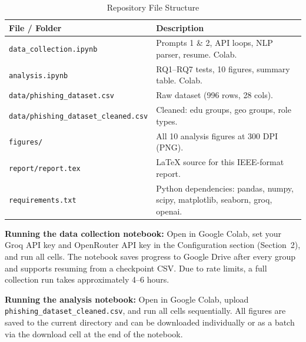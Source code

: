 \documentclass[conference]{IEEEtran}
\begin{document}
\begin{table}[htbp]
\caption{Repository File Structure}
\label{tab:filestructure}
\begin{center}
\renewcommand{\arraystretch}{1.2}
\fontsize{7.5}{9.5}\selectfont
\begin{tabular}{|>{\raggedright\arraybackslash}p{3.2cm}|>{\raggedright\arraybackslash}p{4.4cm}|}
\hline
\textbf{File / Folder} & \textbf{Description} \\
\hline
\texttt{data\_collection.ipynb}
  & Prompts 1 \& 2, API loops, NLP parser, resume. Colab. \\
\hline
\texttt{analysis.ipynb}
  & RQ1--RQ7 tests, 10 figures, summary table. Colab. \\
\hline
\texttt{data/phishing\_dataset.csv}
  & Raw dataset (996 rows, 28 cols). \\
\hline
\texttt{data/phishing\_dataset\_cleaned.csv}
  & Cleaned: edu groups, geo groups, role types. \\
\hline
\texttt{figures/}
  & All 10 analysis figures at 300 DPI (PNG). \\
\hline
\texttt{report/report.tex}
  & LaTeX source for this IEEE-format report. \\
\hline
\texttt{requirements.txt}
  & Python dependencies: pandas, numpy, scipy, matplotlib, seaborn, groq,
    openai. \\
\hline
\hline
\end{tabular}
\end{center}
\end{table}
 
\noindent\textbf{Running the data collection notebook:} Open in Google Colab, set your Groq API key and OpenRouter API key in the Configuration section (Section~2), and run all cells. 
The notebook saves progress to Google Drive after every group and supports resuming from a checkpoint CSV. 
Due to rate limits, a full collection run takes approximately 4--6 hours.
 
\noindent\textbf{Running the analysis notebook:} Open in Google Colab, upload \texttt{phishing\_dataset\_cleaned.csv}, and run all cells sequentially. 
All figures are saved to the current directory and can be downloaded individually or as a batch via the download cell at the end of the notebook.
\end{document}
